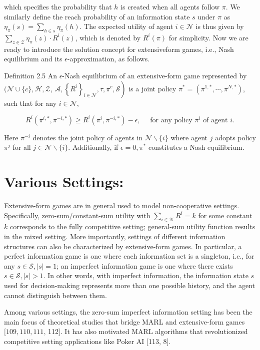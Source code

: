 \documentclass[10pt]{article}
\begin{document}
which specifies the probability that $h$ is created when all agents follow $\pi$. We similarly define the reach probability of an information state $s$ under $\pi$ as $\eta_{\pi}(s)=\sum_{h \in s} \eta_{\pi}(h)$. The expected utility of agent $i \in \mathcal{N}$ is thus given by $\sum_{z \in \mathcal{Z}} \eta_{\pi}(z) \cdot R^{i}(z)$, which is denoted by $R^{i}(\pi)$ for simplicity. Now we are ready to introduce the solution concept for extensiveform games, i.e., Nash equilibrium and its $\epsilon$-approximation, as follows.

Definition 2.5 An $\epsilon$-Nash equilibrium of an extensive-form game represented by $(\mathcal{N} \cup\{c\}, \mathcal{H}, \mathcal{Z}$, $\left.\mathcal{A},\left\{R^{i}\right\}_{i \in \mathcal{N}}, \tau, \pi^{c}, \mathcal{S}\right)$ is a joint policy $\pi^{*}=\left(\pi^{1, *}, \cdots, \pi^{N, *}\right)$, such that for any $i \in \mathcal{N}$,

\[
R^{i}\left(\pi^{i, *}, \pi^{-i, *}\right) \geq R^{i}\left(\pi^{i}, \pi^{-i, *}\right)-\epsilon, \quad \text { for any policy } \pi^{i} \text { of agent } i .
\]

Here $\pi^{-i}$ denotes the joint policy of agents in $\mathcal{N} \backslash\{i\}$ where agent $j$ adopts policy $\pi^{j}$ for all $j \in \mathcal{N} \backslash\{i\}$. Additionally, if $\epsilon=0, \pi^{*}$ constitutes a Nash equilibrium.

\section{Various Settings:}
Extensive-form games are in general used to model non-cooperative settings. Specifically, zero-sum/constant-sum utility with $\sum_{i \in \mathcal{N}} R^{i}=k$ for some constant $k$ corresponds to the fully competitive setting; general-sum utility function results in the mixed setting. More importantly, settings of different information structures can also be characterized by extensive-form games. In particular, a perfect information game is one where each information set is a singleton, i.e., for any $s \in \mathcal{S},|s|=1$; an imperfect information game is one where there exists $s \in \mathcal{S},|s|>1$. In other words, with imperfect information, the information state $s$ used for decision-making represents more than one possible history, and the agent cannot distinguish between them.

Among various settings, the zero-sum imperfect information setting has been the main focus of theoretical studies that bridge MARL and extensive-form games $[109,110,111$, 112]. It has also motivated MARL algorithms that revolutionized competitive setting applications like Poker AI [113, 8].
\end{document}
